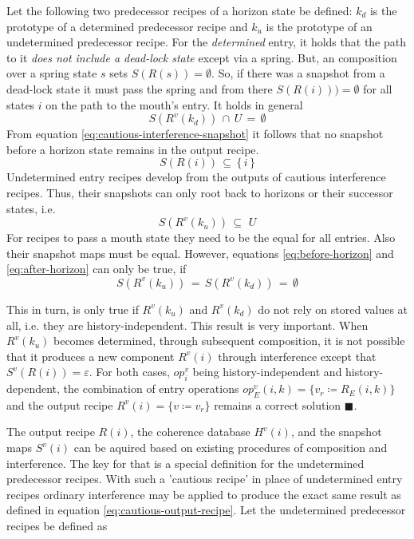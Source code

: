 \documentclass[12pt,a4paper]{scrartcl}
\begin{document}
Let the following two predecessor recipes of a horizon state be defined:
$k_d$ is the prototype of a determined predecessor recipe and $k_u$ is the
prototype of an undetermined predecessor recipe. For the \textit{determined}
entry, it holds that the path to it \textit{does not include a dead-lock state}
except via a spring. But, an composition over a spring state $s$ sets
$S(R(s))=\emptyset$. So, if there was a snapshot from a dead-lock state it must
pass the spring and from there $S(R(i)))=\emptyset$ for all states $i$ on the
path to the mouth's entry. It holds in general
\begin{equation} \label{eq:before-horizon}
        S(R^v(k_d))\,\cap\,U\,=\,\emptyset
\end{equation}
From equation \eqref{eq:cautious-interference-snapshot} it follows that no
snapshot before a horizon state remains in the output recipe.
\begin{equation}
        S(R(i))\,\subseteq\,\{\,i\,\}
\end{equation}
Undetermined entry recipes develop from the outputs of cautious interference 
recipes. Thus, their snapshots can only root back to horizons or their successor
states, i.e.
\begin{equation} \label{eq:after-horizon}
        S(R^v(k_u))\,\subseteq\,\,U
\end{equation}
For recipes to pass a mouth state they need to be the equal for all entries. Also
their snapshot maps must be equal. However, equations
\eqref{eq:before-horizon} and \eqref{eq:after-horizon} can only be true, if
\begin{equation} \label{eq:coherence-condition}
    S(R^v(k_u))\,=\,S(R^v(k_d))\,=\,\emptyset 
\end{equation}

This in turn, is only true if $R^v(k_u)$ and $R^v(k_d)$ do not rely on stored
values at all, i.e. they are history-independent. This result is very important. When
$R^v(k_u)$ becomes determined, through subsequent composition, it is not
possible that it produces a new component $R^v(i)$ through interference except
that $S^v(R(i))=\varepsilon$.  For both cases, $op^v_i$ being history-independent and
history-dependent, the combination of entry operations $op^v_E(i,k) = \{ v_r
\coloneqq R_E(i,k) \}$ and the output recipe $R^v(i)=\{ v\coloneqq v_r \}$
remains a correct solution $\blacksquare$.  

The output recipe $R(i)$, the coherence database $H^v(i)$, and the snapshot
maps $S^v(i)$ can be aquired based on existing procedures of composition and
interference. The key for that is a special definition for the undetermined
predecessor recipes. With such a 'cautious recipe' in place of undetermined
entry recipes ordinary interference may be applied to produce the exact same
result as defined in equation \eqref{eq:cautious-output-recipe}.  Let the
undetermined predecessor recipes be defined as
\end{document}
